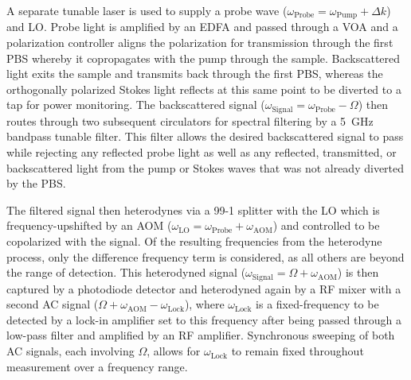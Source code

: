 A separate tunable laser is used to supply a probe wave (\(\omega_{\mathrm{Probe}} = \omega_{\mathrm{Pump}} + \Delta k\)) and \acl{LO}. Probe light is amplified by an \ac{EDFA} and passed through a \ac{VOA} and a polarization controller aligns the polarization for transmission through the first \ac{PBS} whereby it copropagates with the pump through the sample. Backscattered light exits the sample and transmits back through the first \ac{PBS}, whereas the orthogonally polarized Stokes light reflects at this same point to be diverted to a tap for power monitoring. The backscattered signal (\(\omega_{\mathrm{Signal}} = \omega_{\mathrm{Probe}} - \Omega\)) then routes through two subsequent circulators for spectral filtering by a \SI{5}{\giga\hertz} bandpass tunable filter. This filter allows the desired backscattered signal to pass while rejecting any reflected probe light as well as any reflected, transmitted, or backscattered light from the pump or Stokes waves that was not already diverted by the PBS.

The filtered signal then heterodynes via a 99-1 splitter with the \ac{LO} which is frequency-upshifted by an \acl{AOM} (\(\omega_{\mathrm{LO}} = \omega_{\mathrm{Probe}} + \omega_{\mathrm{AOM}}\)) and controlled to be copolarized with the signal. Of the resulting frequencies from the heterodyne process, only the difference frequency term is considered, as all others are beyond the range of detection. This heterodyned signal (\(\omega_{\mathrm{Signal}} = \Omega + \omega_{\mathrm{AOM}}\)) is then captured by a photodiode detector and heterodyned again by a \acl{RF} mixer with a second \ac{AC} signal (\(\Omega + \omega_{\mathrm{AOM}} - \omega_{\mathrm{Lock}}\)), where \(\omega_{\mathrm{Lock}}\) is a fixed-frequency to be detected by a lock-in amplifier set to this frequency after being passed through a low-pass filter and amplified by an \ac{RF} amplifier. Synchronous sweeping of both \ac{AC} signals, each involving \(\Omega\), allows for \(\omega_{\mathrm{Lock}}\) to remain fixed throughout measurement over a frequency range.

